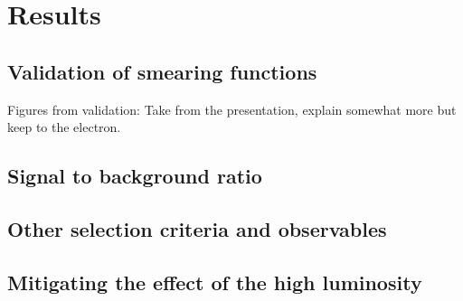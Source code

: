 \chapter{Results}\label{cha:res}
\section{Validation of smearing functions}
Figures from validation:
Take from the presentation, explain somewhat more but keep to the electron.

\section{Signal to background ratio}

\section{Other selection criteria and observables}
\section{Mitigating the effect of the high luminosity}




